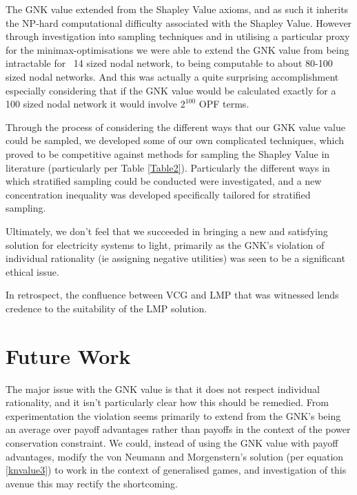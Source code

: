 The GNK value extended from the Shapley Value axioms, and as such it inherits the NP-hard computational difficulty associated with the Shapley Value.
However through investigation into sampling techniques and in utilising a particular proxy for the minimax-optimisations we were able to extend the GNK value from being intractable for ~14 sized nodal network, to being computable to about 80-100 sized nodal networks.
And this was actually a quite surprising accomplishment especially considering that if the GNK value would be calculated exactly for a 100 sized nodal network it would involve $2^{100}$ OPF terms.

Through the process of considering the different ways that our GNK value value could be sampled, we developed some of our own complicated techniques, which proved to be competitive against methods for sampling the Shapley Value in literature (particularly per Table \ref{Table2}).
Particularly the different ways in which stratified sampling could be conducted were investigated, and a new concentration inequality was developed specifically tailored for stratified sampling.

Ultimately, we don't feel that we succeeded in bringing a new and satisfying solution for electricity systems to light, primarily as the GNK's violation of individual rationality (ie assigning negative utilities) was seen to be a significant ethical issue.

In retrospect, the confluence between VCG and LMP that was witnessed lends credence to the suitability of the LMP solution.


\section{Future Work}
\label{sec:future}

The major issue with the GNK value is that it does not respect individual rationality, and it isn't particularly clear how this should be remedied.
From experimentation the violation seems primarily to extend from the GNK's being an average over payoff advantages rather than payoffs in the context of the power conservation constraint.
We could, instead of using the GNK value with payoff advantages, modify the von Neumann and Morgenstern's solution (per equation \ref{knvalue3}) to work in the context of generalised games, and investigation of this avenue this may rectify the shortcoming.

